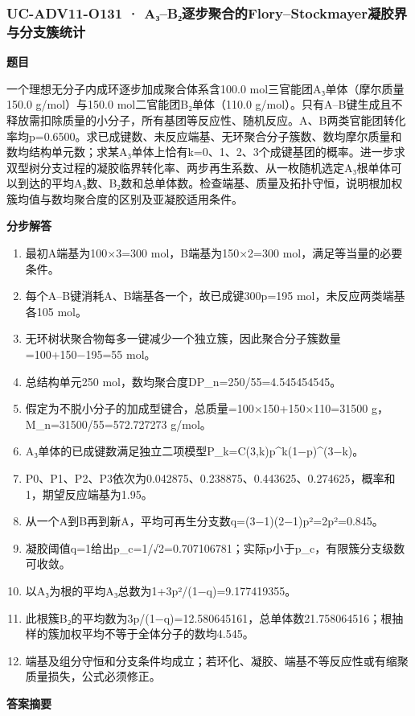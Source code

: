 \documentclass[UTF8,11pt,a4paper]{ctexart}
\begin{document}
\subsubsection*{UC-ADV11-O131 · A₃–B₂逐步聚合的Flory–Stockmayer凝胶界与分支簇统计}
\noindent\textbf{题目}\par
一个理想无分子内成环逐步加成聚合体系含100.0 mol三官能团A₃单体（摩尔质量150.0 g/mol）与150.0 mol二官能团B₂单体（110.0 g/mol）。只有A–B键生成且不释放需扣除质量的小分子，所有基团等反应性、随机反应。A、B两类官能团转化率均p=0.6500。求已成键数、未反应端基、无环聚合分子簇数、数均摩尔质量和数均结构单元数；求某A₃单体上恰有k=0、1、2、3个成键基团的概率。进一步求双型树分支过程的凝胶临界转化率、两步再生系数、从一枚随机选定A₃根单体可以到达的平均A₃数、B₂数和总单体数。检查端基、质量及拓扑守恒，说明根加权簇均值与数均聚合度的区别及亚凝胶适用条件。\par
\medskip\noindent\textbf{分步解答}
\begin{enumerate}
\item 最初A端基为100×3=300 mol，B端基为150×2=300 mol，满足等当量的必要条件。
\item 每个A–B键消耗A、B端基各一个，故已成键300p=195 mol，未反应两类端基各105 mol。
\item 无环树状聚合物每多一键减少一个独立簇，因此聚合分子簇数量=100+150−195=55 mol。
\item 总结构单元250 mol，数均聚合度DP\_n=250/55=4.545454545。
\item 假定为不脱小分子的加成型键合，总质量=100×150+150×110=31500 g，M\_n=31500/55=572.727273 g/mol。
\item A₃单体的已成键数满足独立二项模型P\_k=C(3,k)p\textasciicircum{}k(1−p)\textasciicircum{}(3−k)。
\item P0、P1、P2、P3依次为0.042875、0.238875、0.443625、0.274625，概率和1，期望反应端基为1.95。
\item 从一个A到B再到新A，平均可再生分支数q=(3−1)(2−1)p²=2p²=0.845。
\item 凝胶阈值q=1给出p\_c=1/√2=0.707106781；实际p小于p\_c，有限簇分支级数可收敛。
\item 以A₃为根的平均A₃总数为1+3p²/(1−q)=9.177419355。
\item 此根簇B₂的平均数为3p/(1−q)=12.580645161，总单体数21.758064516；根抽样的簇加权平均不等于全体分子的数均4.545。
\item 端基及组分守恒和分支条件均成立；若环化、凝胶、端基不等反应性或有缩聚质量损失，公式必须修正。
\end{enumerate}
\noindent\textbf{答案摘要}\par
\end{document}
